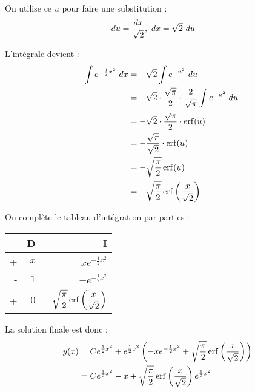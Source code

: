 On utilise ce $u$ pour faire une substitution :
\begin{align*}
    du &= \dfrac{dx}{\sqrt{2}},\ dx = \sqrt{2}\ du
\end{align*}

L'intégrale devient :
\begin{align*}
    -\int{e^{-\frac{1}{2}x^2}\ dx} &= -\sqrt{2}\int{e^{-u^2}\ du} \\
    &= -\sqrt{2}\cdot\dfrac{\sqrt{\pi}}{2}\cdot\dfrac{2}{\sqrt{\pi}}\int{e^{-u^2}\ du} \\
    &= -\sqrt{2}\cdot\dfrac{\sqrt{\pi}}{2}\cdot\operatorname{erf}(u) \\
    &= -\dfrac{\sqrt{\pi}}{\sqrt{2}}\cdot\operatorname{erf}(u) \\
    &= -\sqrt{\dfrac{\pi}{2}}\operatorname{erf}(u) \\
    &= -\sqrt{\dfrac{\pi}{2}}\operatorname{erf}\left({\dfrac{x}{\sqrt{2}}}\right)
\end{align*}

On complète le tableau d'intégration par parties :
\begin{table}[H]
    \centering
    \begin{tabular}{rrr}
	\toprule[1pt]
	 & D & I \\
	\midrule
	+ & $x$ & $xe^{-\frac{1}{2}x^2}$\vspace{1mm}\\
	- & $1$ & $-e^{-\frac{1}{2}x^2}$\vspace{2mm}\\
	+ & $0$ & $-\sqrt{\dfrac{\pi}{2}}\operatorname{erf}\left({\dfrac{x}{\sqrt{2}}}\right)$\vspace{2mm}\\
	\bottomrule[1pt]
    \end{tabular}
\end{table}

La solution finale est donc :
\begin{align*}
    y(x) &= Ce^{\frac{1}{2}x^2} + e^{\frac{1}{2}x^2}
    \left({-xe^{-\frac{1}{2}x^2} + \sqrt{\dfrac{\pi}{2}}\operatorname{erf}\left({\dfrac{x}{\sqrt{2}}}\right)}\right) \\
    &= Ce^{\frac{1}{2}x^2} 
    -x + \sqrt{\dfrac{\pi}{2}}\operatorname{erf}\left({\dfrac{x}{\sqrt{2}}}\right)e^{\frac{1}{2}x^2} \\
\end{align*}
